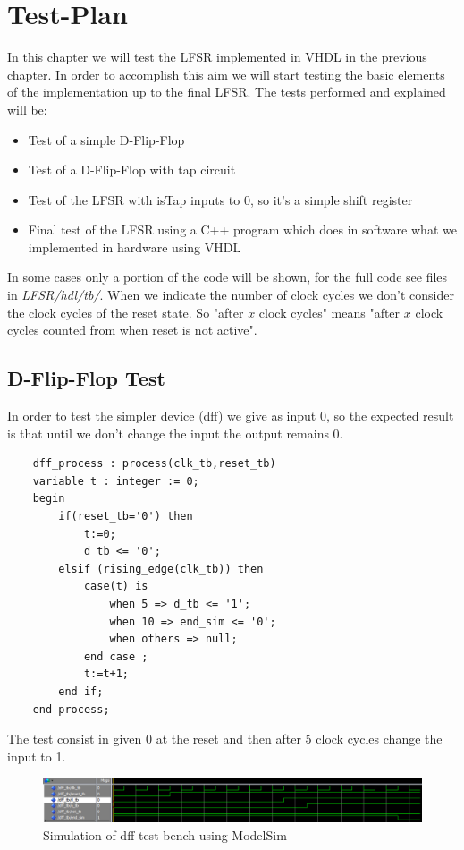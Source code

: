 \documentclass[a4paper]{report}
\begin{document}
\chapter{Test-Plan}
In this chapter we will test the LFSR implemented in VHDL in the previous chapter. In order to accomplish this aim we will start testing the basic elements of the implementation up to the final LFSR. The tests performed and explained will be:
\begin{itemize}
	\item Test of a simple D-Flip-Flop
	\item Test of a D-Flip-Flop with tap circuit
	\item Test of the LFSR with isTap inputs to 0, so it's a simple shift register
	\item Final test of the LFSR using a C++ program which does in software what we implemented in hardware using VHDL
\end{itemize}
In some cases only a portion of the code will be shown, for the full code see files in \emph{LFSR/hdl/tb/}.
\noindent When we indicate the number of clock cycles we don't consider the clock cycles of the reset state. So "after $x$ clock cycles" means "after $x$ clock cycles counted from when reset is not active".  

\section{D-Flip-Flop Test}
In order to test the simpler device (dff) we give as input 0, so the expected result is that until we don't change the input the output remains 0.
\begin{lstlisting}
	dff_process : process(clk_tb,reset_tb)
	variable t : integer := 0;
	begin
		if(reset_tb='0') then
			t:=0;
			d_tb <= '0';
		elsif (rising_edge(clk_tb)) then
			case(t) is
				when 5 => d_tb <= '1';	
				when 10 => end_sim <= '0';	
				when others => null;		
			end case ;
			t:=t+1;
		end if;
	end process;
\end{lstlisting}
The test consist in given 0 at the reset and then after 5 clock cycles change the input to 1.
\begin{figure}[htpb]
	\centering
	\includegraphics[width=.6\textheight, height=.125\textheight]{img/tb/wave_dff_test.png}
	\caption{Simulation of dff test-bench using ModelSim}
\end{figure}
\end{document}
